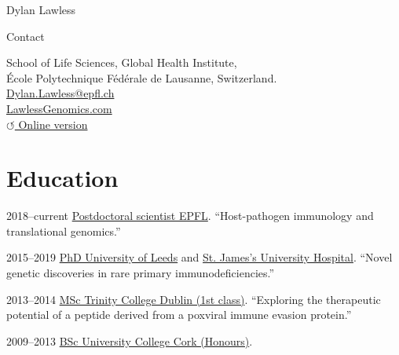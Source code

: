 \documentclass[11pt,a4paper]{article}
\begin{document}
\begin{cv}{Dylan Lawless} 
  \begin{cvlist}{Contact}
  \item School of Life Sciences, Global Health Institute, \\
    \'Ecole Polytechnique F\'ed\'erale de Lausanne,
    Switzerland. \\
    \href{mailto:Dylan.Lawless@epfl.ch}{Dylan.Lawless@epfl.ch}\\
    \href{https://lawlessgenomics.com}{LawlessGenomics.com}\\
    \href{https://lawlessgenomics.com/resume/pdf/Dylan_Lawless.pdf}{$\circlearrowleft$ Online version}
\end{cvlist}

\section*{Education}
\begin{cvlist}{}
  \item[2018--current] \href{https://fellay-lab.epfl.ch}{Postdoctoral scientist EPFL}. ``Host-pathogen immunology and translational genomics.''
  \item[2015--2019] \href{https://medicinehealth.leeds.ac.uk/medicine}{PhD University of Leeds} and \href{https://medicinehealth.leeds.ac.uk/homepage/160/leeds_institute_of_medical_research_at_st_jamess}{St. James's University Hospital}. ``Novel genetic discoveries in rare primary immunodeficiencies.''
  \item[2013--2014] \href{https://www.tcd.ie/biosciences/}{MSc Trinity College Dublin (1st class)}. ``Exploring the therapeutic potential of a peptide derived from a poxviral immune evasion protein.''
  \item[2009--2013] \href{https://www.ucc.ie/en/}{BSc University College Cork (Honours)}.
  \end{cvlist}


\end{cv}
\end{document}
